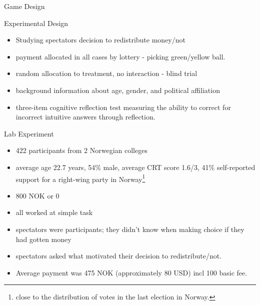 \documentclass{beamer}
\begin{document}
	\begin{frame}{Game Design}
		
	\end{frame}

	\begin{frame}{Experimental Design}

	\begin{block}

		\begin{itemize}
			\item Studying spectators decision to redistribute money/not
			\item payment allocated in all cases by lottery - picking green/yellow ball.
			\item random allocation to treatment, no interaction - blind trial
			\item background information about age, gender, and political affiliation
			\item three-item cognitive reflection test measuring the ability to correct for incorrect
				intuitive answers through reflection.
		\end{itemize}
	\end{block}
\end{frame}

	\begin{frame}{Lab Experiment}

	\begin{block}

		\begin{itemize}
			\item 422 participants from 2 Norwegian colleges
			\item average age 22.7 years, 54\% male, average CRT score 1.6/3, 41\% self-reported support for a right-wing party in Norway\footnote{close to the distribution of votes in the last election in Norway.}
			\item 800 NOK or 0
			\item all worked at simple task
			\item  spectators were participants; they didn't know when making choice if they had gotten money
			\item spectators asked what motivated their decision to redistribute/not.
			\item Average payment was 475 NOK (approximately 80 USD) incl 100 basic fee.
		\end{itemize}
	\end{block}
\end{frame}
\end{document}

